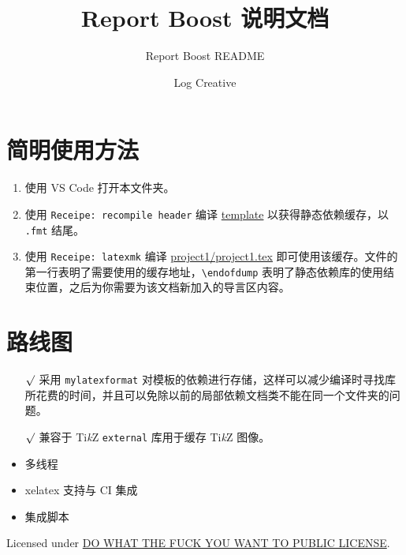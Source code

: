 \endofdump
%
%

    \title{Report Boost 说明文档}
    \subtitle{Report Boost README}
    \author{Log Creative}
    \maketitle

\section{简明使用方法}
\begin{enumerate}
    \item 使用 VS Code 打开本文件夹。
    \item 使用 \verb"Receipe: recompile header" 编译 \href{run:../template.tex}{template} 以获得静态依赖缓存，以 \verb".fmt" 结尾。
    \item 使用 \verb"Receipe: latexmk" 编译 \href{run:project1.tex}{project1/project1.tex} 即可使用该缓存。文件的第一行表明了需要使用的缓存地址，\verb"\endofdump" 表明了静态依赖库的使用结束位置，之后为你需要为该文档新加入的导言区内容。
\end{enumerate}

\section{路线图}

\begin{itemize}
    \item[$\surd$] 采用 \verb"mylatexformat" 对模板的依赖进行存储，这样可以减少编译时寻找库所花费的时间，并且可以免除以前的局部依赖文档类不能在同一个文件夹的问题。
    \item[$\surd$] 兼容于 Ti\emph{k}Z \verb"external" 库用于缓存 Ti\emph{k}Z 图像。
    \item 多线程
    \item xelatex 支持与 CI 集成
    \item 集成脚本
\end{itemize}

\vfill

{
\scriptsize\centering
Licensed under \href{run:../LICENSE}{DO WHAT THE FUCK YOU WANT TO PUBLIC LICENSE}.
}
